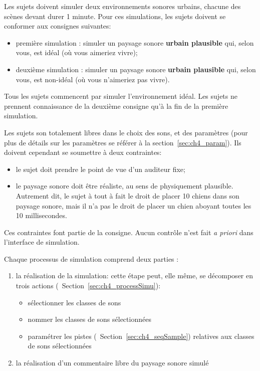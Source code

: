 Les sujets doivent simuler deux environnements sonores urbains, chacune des scènes devant durer 1 minute. Pour ces simulations, les sujets doivent se conformer aux consignes suivantes:

\begin{itemize}
\item première simulation : simuler un paysage sonore \textbf{urbain plausible} qui, selon vous, est idéal (où vous aimeriez vivre);
\item deuxième simulation : simuler un paysage sonore \textbf{urbain plausible} qui, selon vous, est non-idéal (où vous n'aimeriez pas vivre).
\end{itemize}

Tous les sujets commencent par simuler l'environnement idéal. Les sujets ne prennent connaissance de la deuxième consigne qu'à la fin de la première simulation.

Les sujets son totalement libres dans le choix des sons, et des paramètres (pour plus de détails sur les paramètres se référer à la section~\ref{sec:ch4_param}). Ils doivent cependant se soumettre à deux contraintes:

\begin{itemize}
\item le sujet doit prendre le point de vue d’un auditeur fixe;

\item le paysage sonore doit être réaliste, au sens de physiquement plausible. Autrement dit, le sujet à tout à fait le droit de placer 10 chiens dans son paysage sonore, mais il n’a pas le droit de placer un chien aboyant toutes les 10 millisecondes.

\end{itemize}

Ces contraintes font partie de la consigne. Aucun contrôle n'est fait \emph{a priori} dans l'interface de simulation.

Chaque processus de simulation comprend deux parties :

\begin{enumerate}
\item la réalisation de la simulation: cette étape peut, elle même, se décomposer en trois actions (\cf~Section~\ref{sec:ch4_processSimu}):
\begin{itemize}
\item sélectionner les classes de sons
\item nommer les classes de sons sélectionnées
\item paramétrer les pistes (\cf~Section~\ref{sec:ch4_seqSample}) relatives aux classes de sons sélectionnées
\end{itemize}
\item la réalisation d'un commentaire libre du paysage sonore simulé
\end{enumerate}

